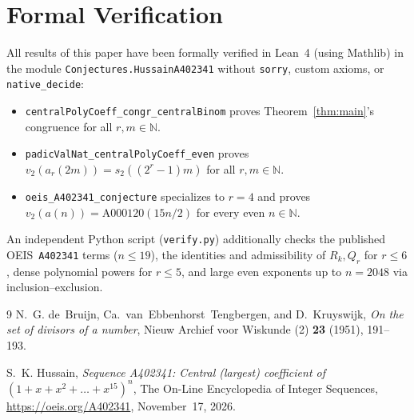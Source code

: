 \documentclass[11pt]{article}
\theoremstyle{remark}
\begin{document}
\section{Formal Verification}

All results of this paper have been formally verified in Lean~4 (using Mathlib) in the module \texttt{Conjectures.HussainA402341} without \texttt{sorry}, custom axioms, or \texttt{native\_decide}:
\begin{itemize}
  \item \texttt{centralPolyCoeff\_congr\_centralBinom} proves Theorem~\ref{thm:main}'s congruence for all $r, m \in \mathbb{N}$.
  \item \texttt{padicValNat\_centralPolyCoeff\_even} proves $v_2(a_r(2m)) = s_2((2^r-1)m)$ for all $r, m \in \mathbb{N}$.
  \item \texttt{oeis\_A402341\_conjecture} specializes to $r = 4$ and proves $v_2(a(n)) = \mathrm{A000120}(15n/2)$ for every even $n \in \mathbb{N}$.
\end{itemize}
An independent Python script (\texttt{verify.py}) additionally checks the published OEIS~\texttt{A402341} terms ($n \le 19$), the identities and admissibility of $R_k, Q_r$ for $r \le 6$, dense polynomial powers for $r \le 5$, and large even exponents up to $n = 2048$ via inclusion--exclusion.

\begin{thebibliography}{9}
N.~G. de~Bruijn, Ca.~van~Ebbenhorst~Tengbergen, and D.~Kruyswijk,
\emph{On the set of divisors of a number},
Nieuw Archief voor Wiskunde (2) \textbf{23} (1951), 191--193.

S.~K. Hussain,
\emph{Sequence A402341: Central (largest) coefficient of $(1 + x + x^2 + \dots + x^{15})^n$},
The On-Line Encyclopedia of Integer Sequences, \url{https://oeis.org/A402341}, November~17, 2026.
\end{thebibliography}
\end{document}
